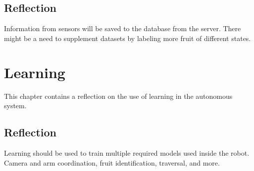 \documentclass[%
oneside,    %
project,    %
nosummary   %
]{USN-MSc}
\begin{document}
\section{Reflection}
Information from sensors will be saved to the database from the server. There might be a need to supplement datasets by labeling more fruit of different states.


\chapter{Learning}
\label{ch:learn}
This chapter contains a reflection on the use of learning in the autonomous system.
\section{Reflection}
Learning should be used to train multiple required models used inside the robot. Camera and arm coordination, fruit identification, traversal, and more.

~\nocite{*}

\cleardoublepage

\printbibliography[heading=bibintoc, title={References}]




%
%
%
%
%
%
\end{document}
